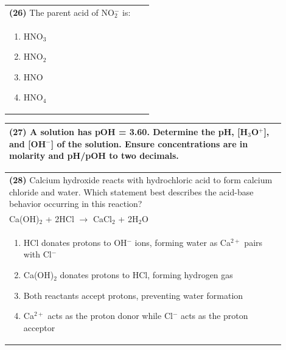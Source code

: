 \documentclass{article}
\begin{document}
\noindent\begin{tabular}{|p{0.9\linewidth}|}
\hline
\textbf{(26)} The parent acid of NO$_2^-$ is: \\[0.2cm]
\begin{minipage}{0.85\linewidth}
\begin{enumerate}[label=\alph*.]
\item HNO$_3$ \item HNO$_2$ \item HNO \item HNO$_4$
\end{enumerate}
\end{minipage}\\[0.2cm]
\hline
\end{tabular}

\noindent\begin{tabular}{|p{0.9\linewidth}|}
\hline
\textbf{(27)} A solution has pOH = 3.60. Determine the pH, [H$_3$O$^+$], and [OH$^-$] of the solution.  Ensure concentrations are in molarity and pH/pOH to two decimals. \\[4cm]
\hline
\end{tabular}

\noindent\begin{tabular}{|p{0.9\linewidth}|}
\hline
\textbf{(28)} Calcium hydroxide reacts with hydrochloric acid to form calcium chloride and water. Which statement best describes the acid-base behavior occurring in this reaction?\\[0.2cm]
Ca(OH)$_2$ + 2HCl $\rightarrow$ CaCl$_2$ + 2H$_2$O\\[0.2cm]
\begin{minipage}[t]{0.85\linewidth}
\begin{enumerate}[label=\alph*.]
\item HCl donates protons to OH$^-$ ions, forming water as Ca$^{2+}$ pairs with Cl$^-$
\item Ca(OH)$_2$ donates protons to HCl, forming hydrogen gas
\item Both reactants accept protons, preventing water formation
\item Ca$^{2+}$ acts as the proton donor while Cl$^-$ acts as the proton acceptor
\end{enumerate}
\end{minipage}\\[0.2cm]
\hline
\end{tabular}
\newpage
\end{document}
